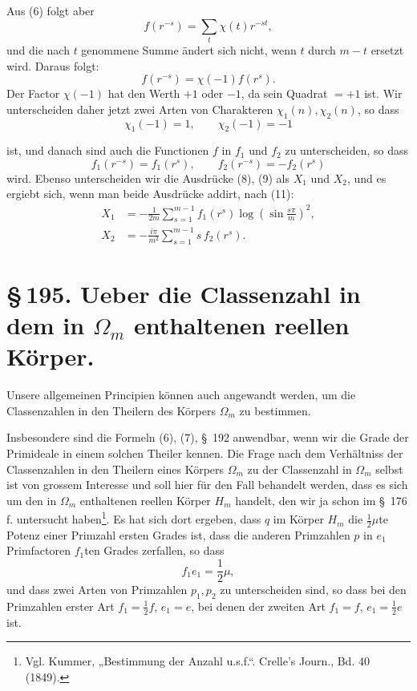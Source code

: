 \documentclass[11pt]{article}
\begin{document}
Aus (6) folgt aber
\[
f(r^{-s})=\sum_t\chi(t)r^{-st},
\]
und die nach $t$ genommene Summe ändert sich nicht, wenn $t$ durch $m-t$ ersetzt wird. Daraus folgt:
\[
f(r^{-s})=\chi(-1)f(r^s).
\]
Der Factor $\chi(-1)$ hat den Werth $+1$ oder $-1$, da sein Quadrat $=+1$ ist. Wir unterscheiden daher jetzt zwei Arten von Charakteren $\chi_1(n),\chi_2(n)$, so dass
\begin{equation}
\chi_1(-1)=1,\qquad \chi_2(-1)=-1
\tag{10}
\end{equation}

ist, und danach sind auch die Functionen $f$ in $f_1$ und $f_2$ zu unterscheiden, so dass
\begin{equation}
f_1(r^{-s})=f_1(r^s),\qquad f_2(r^{-s})=-f_2(r^s)
\tag{11}
\end{equation}
wird. Ebenso unterscheiden wir die Ausdrücke (8), (9) als $X_1$ und $X_2$, und es ergiebt sich, wenn man beide Ausdrücke addirt, nach (11):
\begin{equation}
\begin{aligned}
X_1&=-\frac1{2m}\sum_{s=1}^{m-1}f_1(r^s)\log\left(\sin\frac{s\pi}{m}\right)^2,\\
X_2&=-\frac{i\pi}{m^2}\sum_{s=1}^{m-1}s\,f_2(r^s).
\end{aligned}
\tag{12}
\end{equation}

\clearpage
\section*{\S\,195. Ueber die Classenzahl in dem in $\Omega_m$ enthaltenen reellen Körper.}

Unsere allgemeinen Principien können auch angewandt werden, um die Classenzahlen in den Theilern des Körpers $\Omega_m$ zu bestimmen.

Insbesondere sind die Formeln (6), (7), \S~192 anwendbar, wenn wir die Grade der Primideale in einem solchen Theiler kennen. Die Frage nach dem Verhältniss der Classenzahlen in den Theilern eines Körpers $\Omega_m$ zu der Classenzahl in $\Omega_m$ selbst ist von grossem Interesse und soll hier für den Fall behandelt werden, dass es sich um den in $\Omega_m$ enthaltenen reellen Körper $H_m$ handelt, den wir ja schon im \S~176 f. untersucht haben\footnote{Vgl. Kummer, „Bestimmung der Anzahl u.s.f.“. Crelle's Journ., Bd. 40 (1849).}. Es hat sich dort ergeben, dass $q$ im Körper $H_m$ die $\frac12\mu$te Potenz einer Primzahl ersten Grades ist, dass die anderen Primzahlen $p$ in $e_1$ Primfactoren $f_1$ten Grades zerfallen, so dass
\begin{equation}
f_1e_1=\frac12\mu,
\tag{1}
\end{equation}
und dass zwei Arten von Primzahlen $p_1,p_2$ zu unterscheiden sind, so dass bei den Primzahlen erster Art $f_1=\frac12 f$, $e_1=e$, bei denen der zweiten Art $f_1=f$, $e_1=\frac12 e$ ist.
\end{document}
